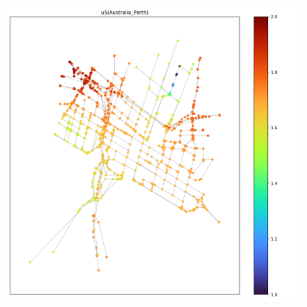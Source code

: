 \documentclass[dvipdfmx]{jsarticle}
\begin{document}
\begin{figure}[h]
  \centering
  \includegraphics[width=\linewidth]{fig/u5_Australia_Perth.png}
\end{figure}
\end{document}
